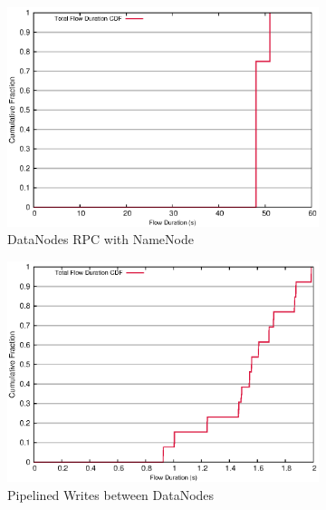 \begin{figure}[!htbp]
\centering
  \begin{subfigure}[b]{.45\linewidth}
   \centering
	\includegraphics[width=.99\textwidth]{figures/replica_change/24_28_flow_duration.eps} 
	\caption{DataNodes RPC with NameNode}\label{fig:replica_duration:rpc}
   \end{subfigure}%
  \begin{subfigure}[b]{.45\linewidth}
   \centering
	\includegraphics[width=.99\textwidth]{figures/replica_change/36_32_flow_duration.eps} 
	\caption{Pipelined Writes between DataNodes}\label{fig:replica_duration:pipe_write}
   \end{subfigure} \\%
  \begin{subfigure}[b]{.55\linewidth}
   \centering

\end{subfigure}
\end{figure}
